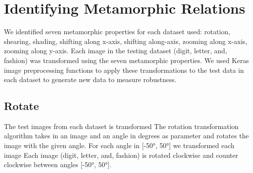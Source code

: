 \section{Identifying Metamorphic Relations} 
We identified seven metamorphic properties for each dataset used: rotation, shearing, shading, shifting along x-axis, shifting along-axis, zooming along x-axis, zooming along y-axis. Each image in the testing dataset (digit, letter, and, fashion) was transformed using the seven metamorphic properties. We used Keras image preprocessing functions to apply these transformations to the test data in each dataset to generate new data to measure robustness.
\subsection{Rotate}
The test images from each dataset is transformed The rotation transformation algorithm takes in an image and an angle in degrees as parameter and rotates the image with the given angle. For each angle in [\ang{-50}, \ang{50}] we transformed each image Each image (digit, letter, and, fashion) is rotated clockwise and counter clockwise between angles [\ang{-50}, \ang{50}]. 

